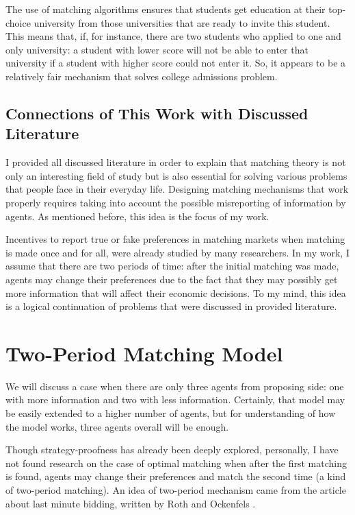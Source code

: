 \documentclass[a4paper]{article} %
\begin{document}
\hfill
\break
The use of matching algorithms ensures that students get education at their top-choice university from those universities that are ready to invite this student. This means that, if, for instance, there are two students who applied to one and only university: a student with lower score will not be able to enter that university if a student with higher score could not enter it. So, it appears to be a relatively fair mechanism that solves college admissions problem.






\subsection{Connections of This Work with Discussed Literature}
I provided all discussed literature in order to explain that matching theory is not only an interesting field of study but is also essential for solving various problems that people face in their everyday life. Designing matching mechanisms that work properly requires taking into account the possible misreporting of information by agents. As mentioned before, this idea is the focus of my work.

\hfill 
\break
Incentives to report true or fake preferences in matching markets when matching is made once and for all, were already studied by many researchers. In my work, I assume that there are two periods of time: after the initial matching was made, agents may change their preferences due to the fact that they may possibly get more information that will affect their economic decisions. To my mind, this idea is a logical continuation of problems that were discussed in provided literature.









\section{Two-Period Matching Model}
We will discuss a case when there are only three agents from proposing side: one with more information and two with less information. Certainly, that model may be easily extended to a higher number of agents, but for understanding of how the model works, three agents overall will be enough.

\hfill
\break
Though strategy-proofness has already been deeply explored, personally, I have not found research on the case of optimal matching when after the first matching is found, agents may change their preferences and match the second time (a kind of two-period matching). An idea of two-period mechanism came from the article about last minute bidding, written by Roth and Ockenfels \cite{LastMinuteBidding}.
\end{document}
